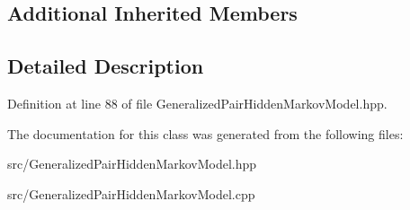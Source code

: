 \subsection*{Additional Inherited Members}


\subsection{Detailed Description}


Definition at line 88 of file Generalized\+Pair\+Hidden\+Markov\+Model.\+hpp.



The documentation for this class was generated from the following files\+:\begin{DoxyCompactItemize}
\item 
src/Generalized\+Pair\+Hidden\+Markov\+Model.\+hpp\item 
src/Generalized\+Pair\+Hidden\+Markov\+Model.\+cpp\end{DoxyCompactItemize}
